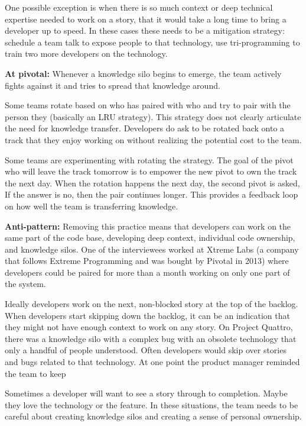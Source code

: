 \begin{table}[]
One possible exception is when there is so much context or deep technical expertise needed to work on a story, that it would take a long time to bring a developer up to speed. In these cases these needs to be a mitigation strategy: schedule a team talk to expose people to that technology, use tri-programming to train two more developers on the technology.

\textbf{At pivotal:} Whenever a knowledge silo begins to emerge, the team actively fights against it and tries to spread that knowledge around. 

Some teams rotate based on who has paired with who and try to pair with the person they  (basically an LRU strategy). This strategy does not clearly articulate the need for knowledge transfer. Developers do ask to be rotated back onto a track that they enjoy working on without realizing the potential cost to the team. 

Some teams are experimenting with rotating the  strategy. The goal of the pivot who will leave the track tomorrow is to empower the new pivot to own the track the next day. When the rotation happens the next day, the second pivot is asked,  If the answer is no, then the pair continues longer. This provides a feedback loop on how well the team is transferring knowledge.  

\textbf{Anti-pattern:} Removing this practice means that developers can work on the same part of the code base, developing deep context, individual code ownership, and knowledge silos. One of the interviewees worked at Xtreme Labs (a company that follows Extreme Programming and was bought by Pivotal in 2013) where developers could be paired for more than a month working on only one part of the system. 

Ideally developers work on the next, non-blocked story at the top of the backlog. When developers start skipping down the backlog, it can be an indication that they might not have enough context to work on any story. On Project Quattro, there was a knowledge silo with a complex bug with an obsolete technology that only a handful of people understood. Often developers would skip over stories and bugs related to that technology. At one point the product manager reminded the team to keep  

Sometimes a developer will want to see a story through to completion. Maybe they love the technology or the feature. In these situations, the team needs to be careful about creating knowledge silos and creating a sense of personal ownership.


\end{table}
